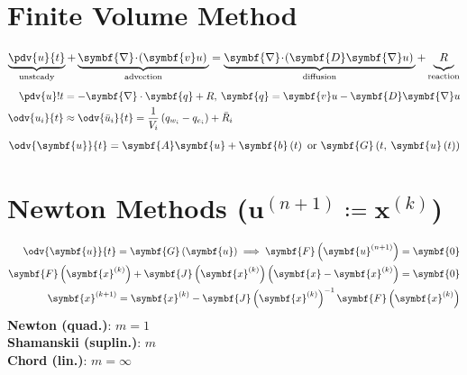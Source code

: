 \documentclass{article}
\begin{document}
\hfill%
\begin{minipage}[t]{62.39259259mm}
    \section{Finite Volume Method}
    \begin{equation*}
        \underbrace{\pdv{u}{t}}_{\text{unsteady}} + \underbrace{\symbf{\nabla} \!\cdot\! \left( \symbf{v} u \right) \vphantom{\pdv{u}{t}}}_{\text{advection}} = \underbrace{\symbf{\nabla} \!\cdot\! \left( \symbf{D} \symbf{\nabla} u \right) \vphantom{\pdv{u}{t}}}_{\text{diffusion}} + \underbrace{R \vphantom{\pdv{u}{t}}}_{\text{reaction}}
    \end{equation*}
    \begin{align*}
        \pdv{u}!{t}   & = - \symbf{\nabla} \cdot \symbf{q} + R,\: \symbf{q} = \symbf{v} u - \symbf{D} \symbf{\nabla} u \\
        \odv{u_i}{t} & \approx \odv{\bar{u}_i}{t} = \frac{1}{V_i} \left( q_{w_i} - q_{e_i} \right) + \bar{R}_i
    \end{align*}
    \begin{equation*}
        \odv{\symbf{u}}{t} = \symbf{A} \symbf{u} + \symbf{b}\left( t \right) \text{ or } \symbf{G}\left( t,\: \symbf{u}\left( t \right) \right)
    \end{equation*}
    \section{Newton Methods (\texorpdfstring{\(\symbf{u}^{\left( n+1 \right)} \coloneq \symbf{x}^{\left( k \right)}\)}{u(n+1) = x(k)})}
    \begin{align*}
        \odv{\symbf{u}}{t} = \symbf{G}\left( \symbf{u} \right) \implies \symbf{F}\left( \symbf{u}^{\left( n+1 \right)} \right) = \symbf{0}                                              & \\
        \symbf{F}\left( \symbf{x}^{\left( k \right)} \right) + \symbf{J}\left( \symbf{x}^{\left( k \right)} \right) \left( \symbf{x} - \symbf{x}^{\left( k \right)} \right) = \symbf{0} & \\
        \symbf{x}^{\left( k+1 \right)} = \symbf{x}^{\left( k \right)} - \symbf{J}\left( \symbf{x}^{\left( k \right)} \right)^{-1} \symbf{F}\left( \symbf{x}^{\left( k \right)} \right)  &
    \end{align*}
    \textbf{Newton (quad.)}: \(m = 1\) \\
    \textbf{Shamanskii (suplin.)}: \(m\) \\
    \textbf{Chord (lin.)}: \(m = \infty\)

\end{minipage}
\end{document}
